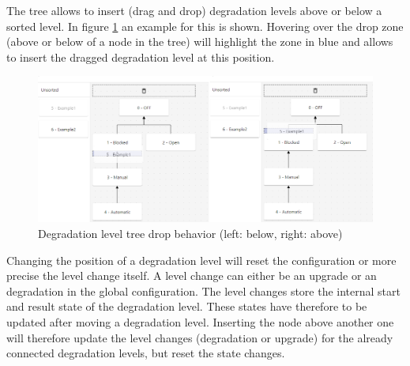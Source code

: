 The tree allows to insert (drag and drop) degradation levels above or below a sorted level. In figure \ref{fig:degradation_level_tree_drop} an example for this is shown. Hovering over the drop zone (above or below of a node in the tree) will highlight the zone in blue and allows to insert the dragged degradation level at this position. 

\begin{figure}[ht]
    \centering
    \includegraphics[width=\textwidth]{img/degradation_tree_drop.png}
    \caption{Degradation level tree drop behavior (left: below, right: above)}
    \label{fig:degradation_level_tree_drop}
\end{figure}

Changing the position of a degradation level will reset the configuration or more precise the level change itself. A level change can either be an upgrade or an degradation in the global configuration. The level changes store the internal start and result state of the degradation level. These states have therefore to be updated after moving a degradation level. Inserting the node above another one will therefore update the level changes (degradation or upgrade) for the already connected degradation levels, but reset the state changes.

